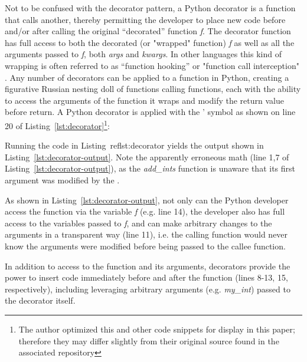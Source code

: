 Not to be confused with the decorator pattern, a Python decorator is a 
function that calls another, thereby permitting the developer to place new code 
before and/or after calling the original “decorated” function \textit{f}.  
The decorator function has full access to both the decorated 
(or "wrapped" function) \textit{f} as well as all the 
arguments passed to \textit{f}, both \textit{args} and \textit{kwargs}.  In other 
languages this kind of wrapping is often referred to as 
“function hooking” or "function call interception" 
 \cite{kang2018function}. Any number of decorators can be applied to a function 
in Python, creating a figurative Russian nesting doll of
functions calling functions, each with the ability to access the 
arguments of the function it wraps and modify the 
return value before return. A Python decorator is applied with the \lq@\rq 
symbol as shown on line 20 of Listing~\ref{lst:decorator}\footnote{The author optimized this and other code snippets for display in 
this paper; therefore they may differ slightly from their original 
source found in the associated repository}:



Running the code in Listing~ref{lst:decorator} yields the output shown in 
Listing~\ref{lst:decorator-output}. Note the apparently erroneous math (line 1,7 of 
Listing~\ref{lst:decorator-output}), as the \textit{add\_ints} function is 
unaware that its first argument was modified by the .

\lstset{style=batstyle}


\lstset{style=pythonstyle}

As shown in Listing~\ref{lst:decorator-output}, not only can the Python developer access the function
via the variable \textit{f} (e.g. line 14), the developer also has full
access to the variables passed to \textit{f}, and can make 
arbitrary changes to the arguments in a transparent way (line 11), 
i.e. the calling function would never know the arguments 
were modified before being passed to the callee function.

In addition to access to the function and its arguments,
decorators provide the power to insert code immediately before and after 
the function (lines 8-13, 15, respectively), including leveraging arbitrary
arguments (e.g. \textit{my\_int}) passed to the decorator itself.

